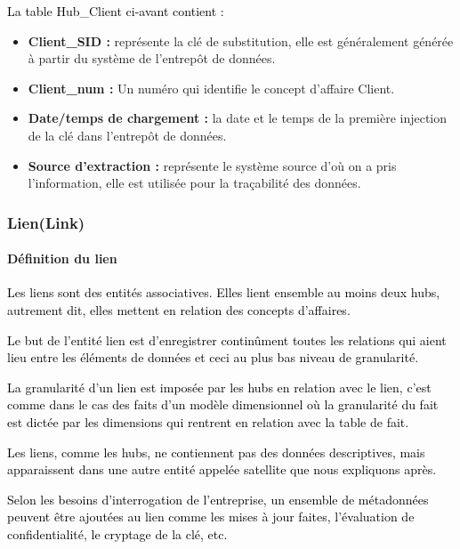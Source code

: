 \documentclass[a4paper,12pt]{report}
\begin{document}
\textcolor{black}{La table Hub\_Client ci-avant contient :}

\begin{itemize}
\item \textbf{Client\_SID :}	 représente la clé de substitution, elle est généralement générée à partir du système de l’entrepôt de données.

\item	\textbf{Client\_num :} Un numéro qui identifie le concept d’affaire Client. 

\item	\textbf{Date/temps de chargement :} la date et le temps de la première injection de la clé dans l’entrepôt de données.


\item	\textbf{Source d’extraction :} représente le système source d’où on a pris l’information, elle est utilisée pour la traçabilité des données.

\end{itemize}


\subsubsection{Lien(Link)}
\paragraph{Définition du lien}

\textcolor{black}{Les liens sont des entités associatives. Elles lient ensemble au moins deux hubs, autrement dit, elles mettent en relation des concepts d’affaires\citep{7}.}

\textcolor{black}{Le but de l’entité lien est d’enregistrer continûment toutes les relations qui aient lieu entre les éléments de données et ceci au plus bas niveau de granularité\citep{awel2014}.
}

\textcolor{black}{La granularité d’un lien est imposée par les hubs en relation avec le lien, c’est comme dans le cas des faits d’un modèle dimensionnel où la granularité du fait est dictée par les dimensions qui rentrent en relation avec la table de fait.}

\textcolor{black}{Les liens, comme les hubs, ne contiennent pas des données descriptives, mais apparaissent dans une autre entité appelée satellite que nous expliquons après.}

\textcolor{black}{Selon les besoins d’interrogation de l’entreprise, un ensemble de métadonnées peuvent être ajoutées au lien comme les mises à jour faites, l’évaluation de confidentialité, le cryptage de la clé, etc.}
\end{document}
